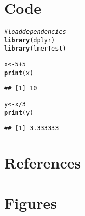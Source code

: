 \documentclass[11pt]{elife}\usepackage[]{graphicx}\usepackage[]{color}
\makeatletter
\newcommand{\hlnum}[1]{\textcolor[rgb]{0.686,0.059,0.569}{#1}}%
\newcommand{\hlcom}[1]{\textcolor[rgb]{0.678,0.584,0.686}{\textit{#1}}}%
\newcommand{\hlopt}[1]{\textcolor[rgb]{0,0,0}{#1}}%
\newcommand{\hlstd}[1]{\textcolor[rgb]{0.345,0.345,0.345}{#1}}%
\newcommand{\hlkwb}[1]{\textcolor[rgb]{0.69,0.353,0.396}{#1}}%
\newcommand{\hlkwd}[1]{\textcolor[rgb]{0.737,0.353,0.396}{\textbf{#1}}}%
\newenvironment{kframe}{%
 \def\at@end@of@kframe{}%
 \ifinner\ifhmode%
  \def\at@end@of@kframe{\end{minipage}}%
  \begin{minipage}{\columnwidth}%
 \fi\fi%
 \def\FrameCommand##1{\hskip\@totalleftmargin \hskip-\fboxsep
 \colorbox{shadecolor}{##1}\hskip-\fboxsep
     \hskip-\linewidth \hskip-\@totalleftmargin \hskip\columnwidth}%
 \MakeFramed {\advance\hsize-\width
   \@totalleftmargin\z@ \linewidth\hsize
   \@setminipage}}%
 {\par\unskip\endMakeFramed%
 \at@end@of@kframe}
\newenvironment{knitrout}{}{} %
\makeatother
\begin{document}
\section{Code}

\begin{knitrout}
\color{fgcolor}\begin{kframe}
\begin{alltt}
\hlcom{# load dependencies}
\hlkwd{library}\hlstd{(dplyr)}
\hlkwd{library}\hlstd{(lmerTest)}

\hlstd{x} \hlkwb{<-} \hlnum{5} \hlopt{+} \hlnum{5}
\hlkwd{print}\hlstd{(x)}
\end{alltt}
\begin{verbatim}
## [1] 10
\end{verbatim}
\end{kframe}
\end{knitrout}

\begin{knitrout}
\color{fgcolor}\begin{kframe}
\begin{alltt}
\hlstd{y} \hlkwb{<-} \hlstd{x}\hlopt{/}\hlnum{3}
\hlkwd{print}\hlstd{(y)}
\end{alltt}
\begin{verbatim}
## [1] 3.333333
\end{verbatim}
\end{kframe}
\end{knitrout}


\section{References}




\section{Figures}


\end{document}
